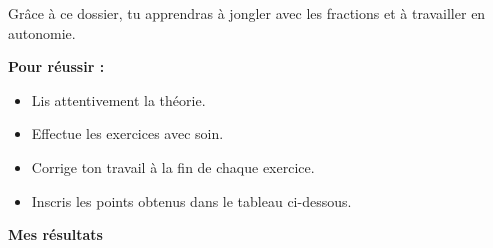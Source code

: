 \vfill
\begin{tcolorbox}[colback=themeNO!10,colframe=themeNO!65!black]
Grâce à ce dossier, tu apprendras à jongler avec les fractions et à travailler en autonomie.

\vspace{3mm}
\textbf{Pour réussir :}
\begin{itemize}[itemsep=1mm, topsep=1mm,label=\rhd]
\item Lis attentivement la théorie.
\item Effectue les exercices avec soin.
\item Corrige ton travail à la fin de chaque exercice.
\item Inscris les points obtenus dans le tableau ci-dessous.
\end{itemize}
\end{tcolorbox}

\vfill
\begin{center}
{\Large\bfseries\color{themeNO!65!black} Mes résultats}
\end{center}

